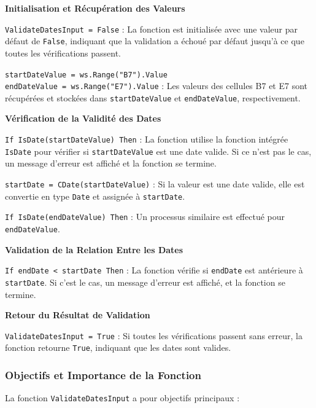 \documentclass[a4paper, oneside, 12pt, final]{extreport}
\begin{document}
\textbf{Initialisation et Récupération des Valeurs}

\texttt{ValidateDatesInput = False} : La fonction est initialisée avec une valeur par défaut de \texttt{False}, indiquant que la validation a échoué par défaut jusqu'à ce que toutes les vérifications passent.

\texttt{startDateValue = ws.Range("B7").Value} \\
\texttt{endDateValue = ws.Range("E7").Value} : Les valeurs des cellules B7 et E7 sont récupérées et stockées dans \texttt{startDateValue} et \texttt{endDateValue}, respectivement.

\textbf{Vérification de la Validité des Dates}

\texttt{If IsDate(startDateValue) Then} : La fonction utilise la fonction intégrée \texttt{IsDate} pour vérifier si \texttt{startDateValue} est une date valide. Si ce n'est pas le cas, un message d'erreur est affiché et la fonction se termine.

\texttt{startDate = CDate(startDateValue)} : Si la valeur est une date valide, elle est convertie en type \texttt{Date} et assignée à \texttt{startDate}.

\texttt{If IsDate(endDateValue) Then} : Un processus similaire est effectué pour \texttt{endDateValue}.

\textbf{Validation de la Relation Entre les Dates}

\texttt{If endDate < startDate Then} : La fonction vérifie si \texttt{endDate} est antérieure à \texttt{startDate}. Si c'est le cas, un message d'erreur est affiché, et la fonction se termine.

\textbf{Retour du Résultat de Validation}

\texttt{ValidateDatesInput = True} : Si toutes les vérifications passent sans erreur, la fonction retourne \texttt{True}, indiquant que les dates sont valides.

\subsubsection{Objectifs et Importance de la Fonction}

La fonction \texttt{ValidateDatesInput} a pour objectifs principaux :
\end{document}
